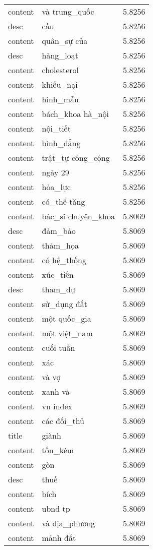 \documentclass{article}
\begin{document}
\begin{tabular}{lll}
content & và trung\_quốc & 5.8256\\
desc & cầu & 5.8256\\
content & quân\_sự của & 5.8256\\
desc & hàng\_loạt & 5.8256\\
content & cholesterol & 5.8256\\
content & khiếu\_nại & 5.8256\\
content & hình\_mẫu & 5.8256\\
content & bách\_khoa hà\_nội & 5.8256\\
content & nội\_tiết & 5.8256\\
content & bình\_đẳng & 5.8256\\
content & trật\_tự công\_cộng & 5.8256\\
content & ngày 29 & 5.8256\\
content & hỏa\_lực & 5.8256\\
content & có\_thể tăng & 5.8256\\
content & bác\_sĩ chuyên\_khoa & 5.8069\\
desc & đảm\_bảo & 5.8069\\
content & thảm\_họa & 5.8069\\
content & có hệ\_thống & 5.8069\\
content & xúc\_tiến & 5.8069\\
desc & tham\_dự & 5.8069\\
content & sử\_dụng đất & 5.8069\\
content & một quốc\_gia & 5.8069\\
content & một việt\_nam & 5.8069\\
content & cuối tuần & 5.8069\\
content & xác & 5.8069\\
content & và vợ & 5.8069\\
content & xanh và & 5.8069\\
content & vn index & 5.8069\\
content & các đối\_thủ & 5.8069\\
title & giành & 5.8069\\
content & tốn\_kém & 5.8069\\
content & gòn & 5.8069\\
desc & thuế & 5.8069\\
content & bích & 5.8069\\
content & ubnd tp & 5.8069\\
content & và địa\_phương & 5.8069\\
content & mảnh đất & 5.8069\\

\end{tabular}
\end{document}
